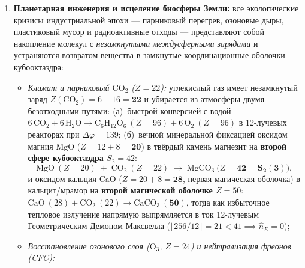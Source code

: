 \begin{enumerate}[label=\textbf{\arabic*.},leftmargin=*]
  \[
    \Delta\varphi_{\mathrm{cipher}}(u_{\mathrm{msg}}, k_{\mathrm{OTP}})
    \;=\;
    \bigl((u_{\mathrm{msg}} + k_{\mathrm{OTP}})\bmod 81\bigr) - 40 \;\in\; [-40, +40],
  \]
  отправитель получает \textbf{двойную защиту на всех $81\times 81 = 6\,561$ парах $(u_{\mathrm{msg}}, k_{\mathrm{OTP}})$}: (1)~для любых внешних Т-фильтров и перехватчиков в канале стоит абсолютный энергетический ноль ($\hat{n}_E(\Delta\varphi_{\mathrm{cipher}})\equiv 0,\ \Phi_{\mathrm{gate}}\equiv 0$ --- факт передачи скрыт!), и (2)~даже внутри Канала~1 латинский квадрат $81\times 81$ обеспечивает совершенную секретность Шеннона $I(u_{\mathrm{msg}};\Delta\varphi_{\mathrm{cipher}})\equiv 0$, тогда как приёмник восстанавливает символ за один такт ротатора: $u_{\mathrm{rec}} = \bigl(\mathcal{S}_3(\Delta\varphi_{\mathrm{cipher}}) + 40 - k_{\mathrm{OTP}}\bigr)\bmod 81 \equiv \mathbf{u_{\mathrm{msg}}}$!
\item \textbf{Планетарная инженерия и исцеление биосферы Земли:}
  все экологические кризисы индустриальной эпохи --- парниковый перегрев, озоновые дыры, пластиковый мусор и радиоактивные отходы --- представляют собой накопление молекул с \emph{незамкнутыми междусферными зарядами} и устраняются возвратом вещества в замкнутые координационные оболочки кубооктаэдра:
  \begin{itemize}[noitemsep]
  \item \emph{Климат и парниковый $\mathrm{CO_2}$ ($Z = 22$):}
    углекислый газ имеет незамкнутый заряд $Z(\mathrm{CO_2}) = 6 + 16 = \mathbf{22}$ и убирается из атмосферы двумя безотходными путями: (а)~быстрой конверсией с водой $6\,\mathrm{CO_2} + 6\,\mathrm{H_2O} \to \mathrm{C_6H_{12}O_6}\ (Z=96) + 6\,\mathrm{O_2}\ (Z=96)$ в 12-лучевых реакторах при $\Delta\varphi = 139$; (б)~вечной минеральной фиксацией оксидом магния $\mathrm{MgO}$ ($Z = 12+8 = \mathbf{20}$) в твёрдый камень магнезит на \textbf{второй сфере кубооктаэдра $S_2 = 42$}:
    \[
      \mathrm{MgO}\ (Z=20) \;+\; \mathrm{CO_2}\ (Z=22) \;\longrightarrow\; \mathrm{MgCO_3}\ \bigl(Z = \mathbf{42 = S_2(3)}\bigr),
    \]
    и оксидом кальция $\mathrm{CaO}$ ($Z = 20+8 = \mathbf{28}$, первая магическая оболочка) в кальцит/мрамор на \textbf{второй магической оболочке $Z = 50$}: $\mathrm{CaO}\ (28) + \mathrm{CO_2}\ (22) \to \mathrm{CaCO_3}\ (\mathbf{50})$, тогда как избыточное тепловое излучение напрямую выпрямляется в ток 12-лучевым Геометрическим Демоном Максвелла ($\lfloor 256/12\rfloor = 21 < 41 \implies \hat{n}_E = 0$);
  \item \emph{Восстановление озонового слоя ($\mathrm{O_3}$, $Z = 24$) и нейтрализация фреонов (CFC):}

\end{itemize}
\end{enumerate}
